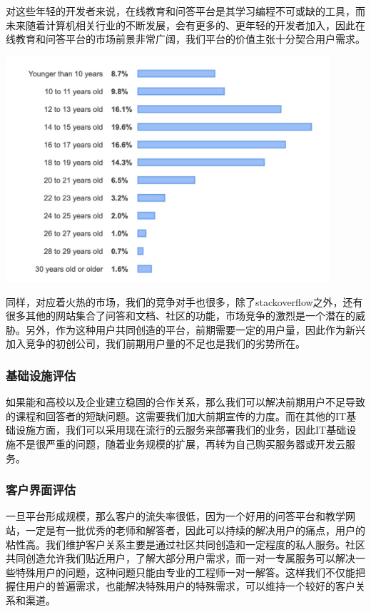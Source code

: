\documentclass[a4paper]{ctexart}
\begin{document}
对这些年轻的开发者来说，在线教育和问答平台是其学习编程不可或缺的工具，而未来随着计算机相关行业的不断发展，会有更多的、更年轻的开发者加入，因此在线教育和问答平台的市场前景非常广阔，我们平台的价值主张十分契合用户需求。

\begin{center}
  \includegraphics[width=12cm]{年龄.png}
\end{center}

同样，对应着火热的市场，我们的竞争对手也很多，除了stackoverflow之外，还有很多其他的网站集合了问答和文档、社区的功能，市场竞争的激烈是一个潜在的威胁。另外，作为这种用户共同创造的平台，前期需要一定的用户量，因此作为新兴加入竞争的初创公司，我们前期用户量的不足也是我们的劣势所在。

\subsubsection{基础设施评估}
如果能和高校以及企业建立稳固的合作关系，那么我们可以解决前期用户不足导致的课程和回答者的短缺问题。这需要我们加大前期宣传的力度。而在其他的IT基础设施方面，我们可以采用现在流行的云服务来部署我们的业务，因此IT基础设施不是很严重的问题，随着业务规模的扩展，再转为自己购买服务器或开发云服务。

\subsubsection{客户界面评估}
一旦平台形成规模，那么客户的流失率很低，因为一个好用的问答平台和教学网站，一定是有一批优秀的老师和解答者，因此可以持续的解决用户的痛点，用户的粘性高。我们维护客户关系主要是通过社区共同创造和一定程度的私人服务。社区共同创造允许我们贴近用户，了解大部分用户需求，而一对一专属服务可以解决一些特殊用户的问题，这种问题只能由专业的工程师一对一解答。这样我们不仅能把握住用户的普遍需求，也能解决特殊用户的特殊需求，可以维持一个较好的客户关系和渠道。
\end{document}
